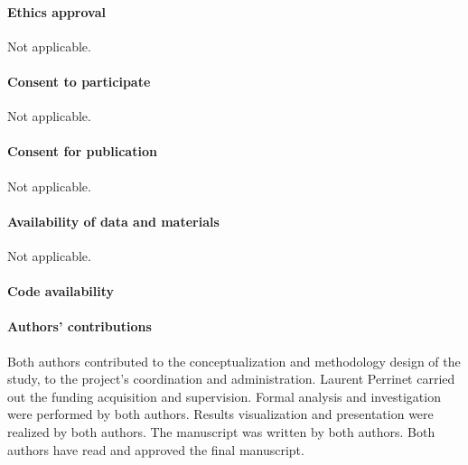 \documentclass[default]{sn-jnl}%
\theoremstyle{thmstyleone}%
\theoremstyle{thmstyletwo}%
\theoremstyle{thmstylethree}%
\begin{document}
\paragraph{Ethics approval}
Not applicable.

\paragraph{Consent to participate}
Not applicable.

\paragraph{Consent for publication}
Not applicable.

\paragraph{Availability of data and materials}
Not applicable.

\paragraph{Code availability}
%
\DataAvailability
%   
\paragraph{Authors' contributions}
% 
Both authors contributed to the conceptualization and methodology design of the study, to the project's coordination and administration. Laurent Perrinet carried out the funding acquisition and supervision. Formal analysis and investigation were performed by both authors. Results visualization and presentation were realized by both authors. The manuscript was written by both authors. Both authors have read and approved the final manuscript.


\end{document}
